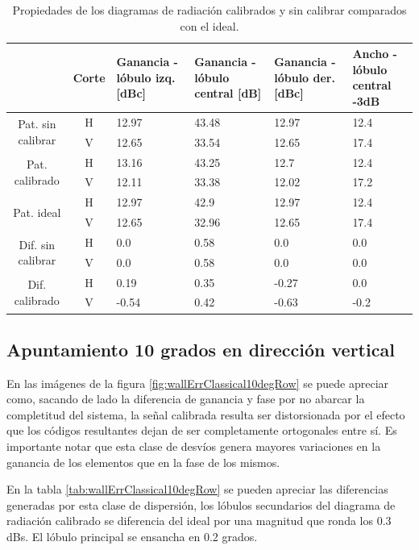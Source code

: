 \begin{table}[H]
  \footnotesize
  \centering
  \begin{tabular}{|c|c|p{2cm}|p{2.5cm}|p{2.5cm}|p{2.5cm}|}
    \cline{2-6}
    \multicolumn{1}{c|}{} & Corte & Ganancia - lóbulo izq. [dBc] & Ganancia - lóbulo central [dB] &
    Ganancia - lóbulo der. [dBc] & Ancho - lóbulo central -3dB \tabularnewline\hline
    \multirow{2}{2cm}{Pat. sin calibrar} & H & 12.97 & 43.48 & 12.97 & 12.4 \tabularnewline\cline{2-6}
     & V & 12.65 & 33.54 & 12.65 & 17.4 \tabularnewline\hline
    \multirow{2}{2cm}{Pat. calibrado} & H & 13.16 & 43.25 & 12.7 & 12.4 \tabularnewline\cline{2-6}
     & V & 12.11 & 33.38 & 12.02 & 17.2 \tabularnewline\hline
    \multirow{2}{2cm}{Pat. ideal} & H & 12.97 & 42.9 & 12.97 & 12.4 \tabularnewline\cline{2-6}
     & V & 12.65 & 32.96 & 12.65 & 17.4 \tabularnewline\hline
    \multirow{2}{2cm}{Dif. sin calibrar} & H & 0.0 & 0.58 & 0.0 & 0.0\tabularnewline\cline{2-6}
     & V & 0.0 & 0.58 & 0.0 & 0.0 \tabularnewline\hline
    \multirow{2}{2cm}{Dif. calibrado} & H & 0.19 & 0.35 & -0.27 & 0.0 \tabularnewline\cline{2-6}
     & V & -0.54 & 0.42 & -0.63 & -0.2 \tabularnewline\hline
  \end{tabular}
  \caption{Propiedades de los diagramas de radiación calibrados y sin calibrar comparados con el ideal.}
  \label{tab:wallErrClassical10degCol}
\end{table}


\subsection{Apuntamiento 10 grados en dirección vertical}

En las imágenes de la figura \ref{fig:wallErrClassical10degRow} se puede apreciar como, sacando de lado la diferencia de ganancia 
y fase por no abarcar la completitud del sistema, la señal calibrada resulta ser distorsionada por el efecto que los códigos 
resultantes dejan de ser completamente ortogonales entre sí. Es importante notar que esta clase de desvíos genera mayores 
variaciones en la ganancia de los elementos que en la fase de los mismos.

En la tabla \ref{tab:wallErrClassical10degRow} se pueden apreciar las diferencias generadas por esta clase de dispersión, los 
lóbulos secundarios del diagrama de radiación calibrado se diferencia del ideal por una magnitud que ronda los 0.3 dBs. El 
lóbulo principal se ensancha en 0.2 grados.

